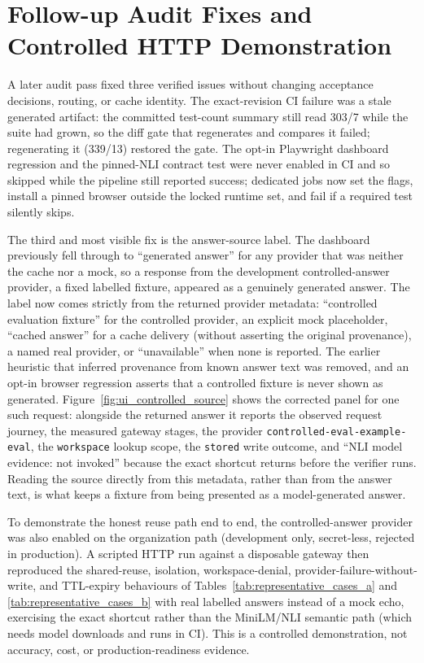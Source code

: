\section{Follow-up Audit Fixes and Controlled HTTP Demonstration}
A later audit pass fixed three verified issues without changing acceptance decisions, routing, or cache identity. The exact-revision CI failure was a stale generated artifact: the committed test-count summary still read 303/7 while the suite had grown, so the diff gate that regenerates and compares it failed; regenerating it (339/13) restored the gate. The opt-in Playwright dashboard regression and the pinned-NLI contract test were never enabled in CI and so skipped while the pipeline still reported success; dedicated jobs now set the flags, install a pinned browser outside the locked runtime set, and fail if a required test silently skips.

The third and most visible fix is the answer-source label. The dashboard previously fell through to ``generated answer'' for any provider that was neither the cache nor a mock, so a response from the development controlled-answer provider, a fixed labelled fixture, appeared as a genuinely generated answer. The label now comes strictly from the returned provider metadata: ``controlled evaluation fixture'' for the controlled provider, an explicit mock placeholder, ``cached answer'' for a cache delivery (without asserting the original provenance), a named real provider, or ``unavailable'' when none is reported. The earlier heuristic that inferred provenance from known answer text was removed, and an opt-in browser regression asserts that a controlled fixture is never shown as generated. Figure~\ref{fig:ui_controlled_source} shows the corrected panel for one such request: alongside the returned answer it reports the observed request journey, the measured gateway stages, the provider \texttt{controlled-eval-example-eval}, the \texttt{workspace} lookup scope, the \texttt{stored} write outcome, and ``NLI model evidence: not invoked'' because the exact shortcut returns before the verifier runs. Reading the source directly from this metadata, rather than from the answer text, is what keeps a fixture from being presented as a model-generated answer.

To demonstrate the honest reuse path end to end, the controlled-answer provider was also enabled on the organization path (development only, secret-less, rejected in production). A scripted HTTP run against a disposable gateway then reproduced the shared-reuse, isolation, workspace-denial, provider-failure-without-write, and TTL-expiry behaviours of Tables~\ref{tab:representative_cases_a} and \ref{tab:representative_cases_b} with real labelled answers instead of a mock echo, exercising the exact shortcut rather than the MiniLM/NLI semantic path (which needs model downloads and runs in CI). This is a controlled demonstration, not accuracy, cost, or production-readiness evidence.

